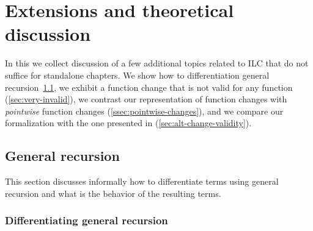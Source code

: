









\def\deriveDefCore{%
\begin{align*}
  \ensuremath{\Derive{\lambda (\Varid{x}\typcolon\sigma)\to \Varid{t}}} &= \ensuremath{\lambda (\Varid{x}\typcolon\sigma)\;(\Varid{dx}\typcolon\Delta \sigma)\to \Derive{\Varid{t}}} \\
  \ensuremath{\Derive{\Varid{s}\;\Varid{t}}} &= \ensuremath{\Derive{\Varid{s}}\;\Varid{t}\;\Derive{\Varid{t}}} \\
  \ensuremath{\Derive{\Varid{x}}} &= \ensuremath{\Varid{dx}} \\
  \ensuremath{\Derive{\Varid{c}}} &= \ensuremath{\DeriveConst{\Varid{c}}}
\end{align*}
}




\chapter{Extensions and theoretical discussion}
\label{ch:misc-extensions}
In this  we collect discussion of a few
additional topics related to ILC that do not suffice for standalone chapters.
We
show how to differentiation general recursion~\cref{sec:general-recursion}, we
exhibit a function change that is not valid for any function
(\cref{sec:very-invalid}), we contrast our representation of function changes
with \emph{pointwise} function changes (\cref{ssec:pointwise-changes}), and we
compare our formalization with the one presented in \citep{CaiEtAl2014ILC}
(\cref{sec:alt-change-validity}).

\section{General recursion}
\label{sec:general-recursion}
This section discusses informally how to differentiate terms
using general recursion and what is the behavior of the resulting terms.

\subsection{Differentiating general recursion}


